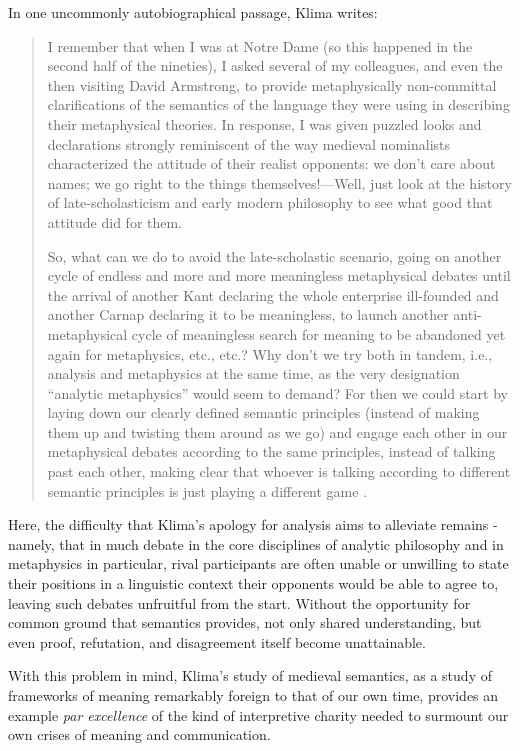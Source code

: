 \documentclass[]{article}
\begin{document}
In one uncommonly autobiographical passage, Klima writes: 
\begin{quote}
I remember that when I was at Notre Dame (so this happened in the second
half of the nineties), I asked several of my colleagues, and even the then
visiting David Armstrong, to provide metaphysically non-committal
clarifications of the semantics of the language they were using in
describing their metaphysical theories. In response, I was given puzzled
looks and declarations strongly reminiscent of the way medieval
nominalists characterized the attitude of their realist opponents: we don’t
care about names; we go right to the things themselves!—Well, just look 
at the history of late-scholasticism and early modern philosophy to see
what good that attitude did for them.

So, what can we do to avoid the late-scholastic scenario, going on another
cycle of endless and more and more meaningless metaphysical debates
until the arrival of another Kant declaring the whole enterprise ill-founded
and another Carnap declaring it to be meaningless, to launch another anti-metaphysical cycle of meaningless search for meaning to be abandoned
yet again for metaphysics, etc., etc.? Why don’t we try both in tandem,
i.e., analysis and metaphysics at the same time, as the very designation
“analytic metaphysics” would seem to demand? For then we could start by
laying down our clearly defined semantic principles (instead of making
them up and twisting them around as we go) and engage each other in our
metaphysical debates according to the same principles, instead of talking
past each other, making clear that whoever is talking according to different
semantic principles is just playing a different game \autocite[86-87]{Klima2014}.
\end{quote}

Here, the difficulty that Klima's apology for analysis aims to alleviate remains - 
namely, that in much debate in the core disciplines of analytic philosophy  
and in metaphysics in particular, 
rival participants are often unable or unwilling to state their positions in a linguistic context their opponents would be able to agree to, 
leaving such debates unfruitful from the start. 
Without the opportunity for common ground that semantics provides, 
not only shared understanding, 
but even proof, refutation, 
and disagreement itself become unattainable.

With this problem in mind, 
Klima's study of medieval semantics, 
as a study of frameworks of meaning remarkably foreign to that of our own time, 
provides an example \emph{par excellence} of the kind of interpretive charity needed to surmount our own crises of meaning and communication. 

\printbibliography
\end{document}
